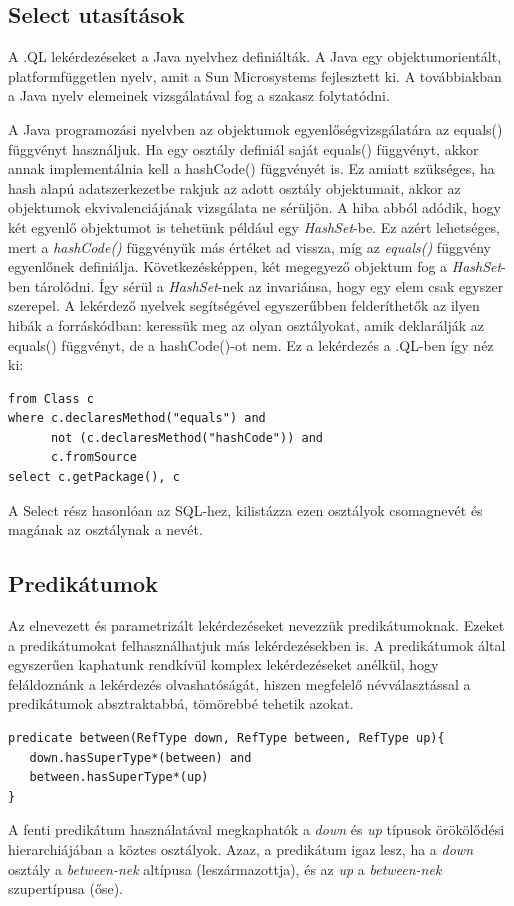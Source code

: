 \documentclass[a4paper,12pt]{report}
\begin{document}
\subsection{Select utasítások}
\par A .QL lekérdezéseket a Java nyelvhez definiálták. A Java egy objektumorientált, platformfüggetlen nyelv, amit a Sun Microsystems fejlesztett ki. A továbbiakban a Java nyelv elemeinek vizsgálatával fog a szakasz folytatódni. 
\par A Java programozási nyelvben az objektumok egyenlőségvizsgálatára az equals() függvényt használjuk. Ha egy osztály definiál saját equals() függvényt, akkor annak implementálnia kell a hashCode() függvényét is. Ez amiatt szükséges, ha hash alapú adatszerkezetbe rakjuk az adott osztály objektumait, akkor az objektumok ekvivalenciájának vizsgálata ne sérüljön. A hiba abból adódik, hogy két egyenlő objektumot is tehetünk például egy \textit{HashSet}-be. Ez azért lehetséges, mert a \textit{hashCode()} függvényük más értéket ad vissza, míg az \textit{equals()} függvény egyenlőnek definiálja. Következésképpen, két megegyező objektum fog a \textit{HashSet}-ben tárolódni. Így sérül a \textit{HashSet}-nek az invariánsa, hogy egy elem csak egyszer szerepel. A lekérdező nyelvek segítségével egyszerűbben felderíthetők az ilyen hibák a forráskódban: keressük meg az olyan osztályokat, amik deklarálják az equals() függvényt, de a hashCode()-ot nem. Ez a lekérdezés a .QL-ben így néz ki:
\begin{verbatim}
from Class c
where c.declaresMethod("equals") and
      not (c.declaresMethod("hashCode")) and
      c.fromSource
select c.getPackage(), c
\end{verbatim}
A Select rész hasonlóan az SQL-hez, kilistázza ezen osztályok csomagnevét és magának az osztálynak a nevét.
\subsection{Predikátumok}
\par Az elnevezett és parametrizált lekérdezéseket nevezzük predikátumoknak. Ezeket a predikátumokat felhasználhatjuk más lekérdezésekben is. A predikátumok által egyszerűen kaphatunk rendkívül komplex lekérdezéseket anélkül, hogy feláldoznánk a lekérdezés olvashatóságát, hiszen megfelelő névválasztással a predikátumok absztraktabbá, tömörebbé tehetik azokat.
\begin{verbatim}
predicate between(RefType down, RefType between, RefType up){
   down.hasSuperType*(between) and
   between.hasSuperType*(up)
}
\end{verbatim}
A fenti predikátum használatával megkaphatók a \textit{down} és \textit{up} típusok örökölődési hierarchiájában a köztes osztályok. Azaz, a predikátum igaz lesz, ha a \textit{down} osztály a \textit{between-nek} altípusa (leszármazottja), és az \textit{up} a \textit{between-nek} szupertípusa (őse).
\end{document}
